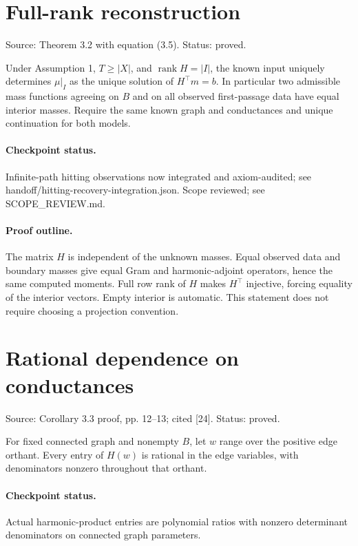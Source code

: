 \section{Full-rank reconstruction}
Source: Theorem 3.2 with equation (3.5). Status: proved.
\begin{theorem}\label{full-recovery}

Under Assumption 1, $T\geq|X|$, and $\operatorname{rank}H=|I|$, the known input uniquely determines $\mu|_I$ as the unique solution of $H^\top m=b$. In particular two admissible mass functions agreeing on $B$ and on all observed first-passage data have equal interior masses. Require the same known graph and conductances and unique continuation for both models.


\paragraph{Checkpoint status.}
Infinite-path hitting observations now integrated and axiom-audited; see handoff/hitting-recovery-integration.json. Scope reviewed; see SCOPE\_REVIEW.md.
\end{theorem}
\paragraph{Proof outline.}

The matrix $H$ is independent of the unknown masses. Equal observed data and boundary masses give equal Gram and harmonic-adjoint operators, hence the same computed moments. Full row rank of $H$ makes $H^\top$ injective, forcing equality of the interior vectors. Empty interior is automatic. This statement does not require choosing a projection convention.
\nodebreak
\section{Rational dependence on conductances}
Source: Corollary 3.3 proof, pp. 12–13; cited [24]. Status: proved.
\begin{lemma}\label{rationality}

For fixed connected graph and nonempty $B$, let $w$ range over the positive edge orthant. Every entry of $H(w)$ is rational in the edge variables, with denominators nonzero throughout that orthant.


\paragraph{Checkpoint status.}
Actual harmonic-product entries are polynomial ratios with nonzero determinant denominators on connected graph parameters.
\end{lemma}
